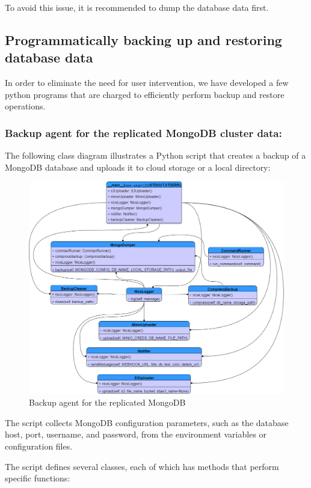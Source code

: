 To avoid this issue, it is recommended to dump the database data first. 

 \subsection{Programmatically backing up and restoring database data }

In order to eliminate the need for user intervention, we have developed a few python programs that are charged to efficiently perform backup and restore operations. 

\subsubsection{Backup agent for the replicated MongoDB cluster data: }

The following class diagram illustrates a Python script that creates a backup of a MongoDB database and uploads it to cloud storage or a local directory: 

 \begin{figure}[H]\centering
\includegraphics[width=1.0\textwidth,angle=00]{assets/f58.png}
\caption{Backup agent for the replicated MongoDB }
\label{fig:f58}
\end{figure}

The script collects MongoDB configuration parameters, such as the database host, port, username, and password, from the environment variables or configuration files. 

The script defines several classes, each of which has methods that perform specific functions: 

